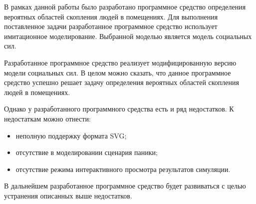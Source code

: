 
В рамках данной работы было разработано программное средство определения вероятных областей скопления людей в помещениях.
Для выполнения поставленное задачи разработанное программное средство использует имитационное моделирование.
Выбранной моделью является модель социальных сил.

Разработанное программное средство реализует модифицированную версию модели социальных сил.
В целом можно сказать, что данное программное средство успешно решает задачу определения вероятных областей скопления людей в помещениях.

Однако у разработанного программного средства есть и ряд недостатков.
К недостаткам можно отнести:
\begin{itemize}
  \item неполную поддержку формата SVG;
  \item отсутствие в моделировании сценария паники;
  \item отсутствие режима интерактивного просмотра результатов симуляции.
\end{itemize}

В дальнейшем разработанное программное средство будет развиваться с целью устранения описанных выше недостатков.
